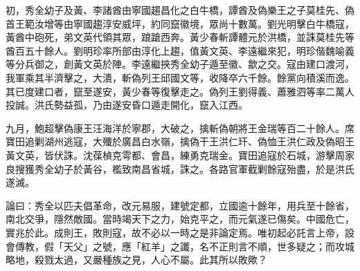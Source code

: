\begin{pinyinscope}
初，秀全幼子及黃、李諸酋由寧國趨昌化之白牛橋，譚酋及偽樂王之子莫桂先、偽首王範汝增等由寧國趨淳安威坪，約同竄徽境，眾尚十數萬。劉光明擊白牛橋寇，黃酋中砲死，弟文英代領其眾，踉蹌西奔。黃少春斬譚體元於洪橋，並誅莫桂先等酋百五十餘人。劉明珍率所部由淳化上趨，值黃文英、李遠繼來犯，明珍偕魏喻義等分兵御之，創黃文英於陣。李遠繼挾秀全幼子遁至徽、歙之交。寇由建口渡河，我軍乘其半濟擊之，大潰，斬偽列王邱國文等，收降卒六千餘。餘黨向積溪而逸。其已度建口者，竄至遂安，黃少春等復擊走之。偽列王劉得義、蕭雅泗等率二萬人投誠。洪氏勢益孤，乃由遂安昏口遁走開化，竄入江西。

九月，鮑超擊偽康王汪海洋於寧郡，大破之，擒斬偽朝將王金瑞等百二十餘人。席寶田追剿湖州逃寇，大殲於廣昌白水嶺，擒偽干王洪仁玕、偽恤王洪仁政及偽昭王黃文英，皆伏誅。沈葆楨克雩都、會昌，練勇克瑞金。寶田追寇於石城，游擊周家良搜獲秀全幼子於黃谷，檻致南昌省城，誅之。各路官軍截剿餘寇殆盡，於是洪氏遂滅。

論曰：秀全以匹夫倡革命，改元易服，建號定都，立國逾十餘年，用兵至十餘省，南北交爭，隱然敵國。當時竭天下之力，始克平之，而元氣遂已傷矣。中國危亡，實兆於此。成則王，敗則寇，故不必以一時之是非論定焉。唯初起必託言上帝，設會傳教，假「天父」之號，應「紅羊」之讖，名不正則言不順，世多疑之；而攻城略地，殺戮太過，又嚴種族之見，人心不屬。此其所以敗歟？


\end{pinyinscope}